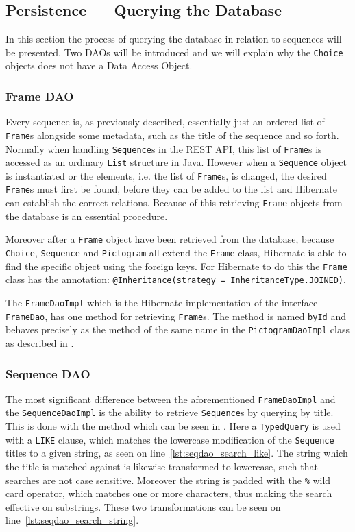 \subsection{Persistence --- Querying the Database}
In this section the process of querying the database in relation to sequences will be presented.
Two DAOs will be introduced and we will explain why the \texttt{Choice} objects does not have a Data Access Object.

\subsubsection{Frame DAO}
Every sequence is, as previously described, essentially just an ordered list of \texttt{Frame}s alongside some metadata, such as the title of the sequence and so forth.
Normally when handling \texttt{Sequence}s in the REST API, this list of \texttt{Frame}s is accessed as an ordinary \texttt{List} structure in Java.
However when a \texttt{Sequence} object is instantiated or the elements, i.e. the list of \texttt{Frame}s, is changed, the desired \texttt{Frame}s must first be found, before they can be added to the list and Hibernate can establish the correct relations.
Because of this retrieving \texttt{Frame} objects from the database is an essential procedure.

Moreover after a \texttt{Frame} object have been retrieved from the database, because \texttt{Choice}, \texttt{Sequence} and \texttt{Pictogram} all extend the \texttt{Frame} class, Hibernate is able to find the specific object using the foreign keys.
For Hibernate to do this the \texttt{Frame} class has the annotation: \texttt{@Inheritance(strategy = InheritanceType.JOINED)}.

\bigskip
The \texttt{FrameDaoImpl} which is the Hibernate implementation of the interface \texttt{FrameDao}, has one method for retrieving \texttt{Frame}s.
The method is named \texttt{byId} and behaves precisely as the method of the same name in the \texttt{PictogramDaoImpl} class as described in .

\subsubsection{Sequence DAO}
The most significant difference between the aforementioned \texttt{FrameDaoImpl} and the \texttt{SequenceDaoImpl} is the ability to retrieve \texttt{Sequence}s by querying by title.
This is done with the method which can be seen in .
Here a \texttt{TypedQuery} is used with a \texttt{LIKE} clause, which matches the lowercase modification of the \texttt{Sequence} titles to a given string, as seen on line~\ref{lst:seqdao_search_like}.
The string which the title is matched against is likewise transformed to lowercase, such that searches are not case sensitive.
Moreover the string is padded with the \texttt{\%} wild card operator, which matches one or more characters, thus making the search effective on substrings.
These two transformations can be seen on line~\ref{lst:seqdao_search_string}.

